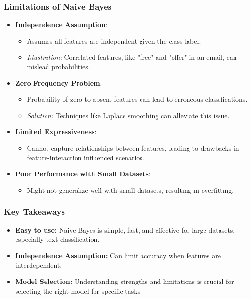 \documentclass[aspectratio=169]{beamer}
\begin{document}
\begin{frame}[fragile]
    \frametitle{Limitations of Naive Bayes}
    \begin{itemize}
        \item \textbf{Independence Assumption}:
        \begin{itemize}
            \item Assumes all features are independent given the class label.
            \item \textit{Illustration:} Correlated features, like "free" and "offer" in an email, can mislead probabilities.
        \end{itemize}

        \item \textbf{Zero Frequency Problem}:
        \begin{itemize}
            \item Probability of zero to absent features can lead to erroneous classifications.
            \item \textit{Solution:} Techniques like Laplace smoothing can alleviate this issue.
        \end{itemize}

        \item \textbf{Limited Expressiveness}:
        \begin{itemize}
            \item Cannot capture relationships between features, leading to drawbacks in feature-interaction influenced scenarios.
        \end{itemize}

        \item \textbf{Poor Performance with Small Datasets}:
        \begin{itemize}
            \item Might not generalize well with small datasets, resulting in overfitting.
        \end{itemize}
    \end{itemize}
\end{frame}

\begin{frame}[fragile]
    \frametitle{Key Takeaways}
    \begin{itemize}
        \item \textbf{Easy to use:} Naive Bayes is simple, fast, and effective for large datasets, especially text classification.
        \item \textbf{Independence Assumption:} Can limit accuracy when features are interdependent.
        \item \textbf{Model Selection:} Understanding strengths and limitations is crucial for selecting the right model for specific tasks.
    \end{itemize}
\end{frame}
\end{document}

